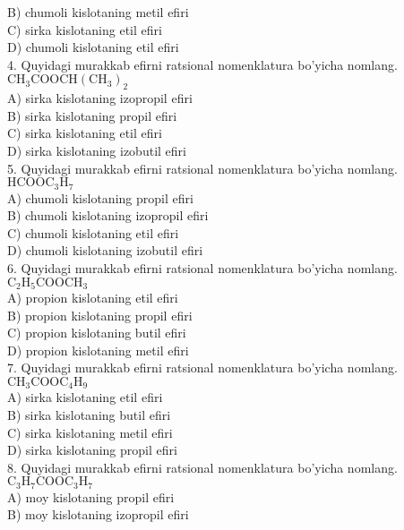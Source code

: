 B) chumoli kislotaning metil efiri\\
C) sirka kislotaning etil efiri\\
D) chumoli kislotaning etil efiri\\
4. Quyidagi murakkab efirni ratsional nomenklatura bo'yicha nomlang.\\
$\mathrm{CH}_{3} \mathrm{COOCH}\left(\mathrm{CH}_{3}\right)_{2}$\\
A) sirka kislotaning izopropil efiri\\
B) sirka kislotaning propil efiri\\
C) sirka kislotaning etil efiri\\
D) sirka kislotaning izobutil efiri\\
5. Quyidagi murakkab efirni ratsional nomenklatura bo'yicha nomlang.\\
$\mathrm{HCOOC}_{3} \mathrm{H}_{7}$\\
A) chumoli kislotaning propil efiri\\
B) chumoli kislotaning izopropil efiri\\
C) chumoli kislotaning etil efiri\\
D) chumoli kislotaning izobutil efiri\\
6. Quyidagi murakkab efirni ratsional nomenklatura bo'yicha nomlang.\\
$\mathrm{C}_{2} \mathrm{H}_{5} \mathrm{COOCH}_{3}$\\
A) propion kislotaning etil efiri\\
B) propion kislotaning propil efiri\\
C) propion kislotaning butil efiri\\
D) propion kislotaning metil efiri\\
7. Quyidagi murakkab efirni ratsional nomenklatura bo'yicha nomlang.\\
$\mathrm{CH}_{3} \mathrm{COOC}_{4} \mathrm{H}_{9}$\\
A) sirka kislotaning etil efiri\\
B) sirka kislotaning butil efiri\\
C) sirka kislotaning metil efiri\\
D) sirka kislotaning propil efiri\\
8. Quyidagi murakkab efirni ratsional nomenklatura bo'yicha nomlang.\\
$\mathrm{C}_{3} \mathrm{H}_{7} \mathrm{COOC}_{3} \mathrm{H}_{7}$\\
A) moy kislotaning propil efiri\\
B) moy kislotaning izopropil efiri\\
